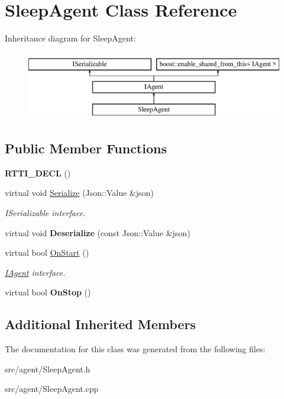 \hypertarget{class_sleep_agent}{}\section{Sleep\+Agent Class Reference}
\label{class_sleep_agent}
Inheritance diagram for Sleep\+Agent\+:\begin{figure}[H]
\begin{center}
\leavevmode
\includegraphics[height=3.000000cm]{class_sleep_agent}
\end{center}
\end{figure}
\subsection*{Public Member Functions}
\begin{DoxyCompactItemize}
\item 
\mbox{\label{class_sleep_agent_a82a480558c4c48a6462a6a4ea15435cf}} 
{\bfseries R\+T\+T\+I\+\_\+\+D\+E\+CL} ()
\item 
\mbox{\label{class_sleep_agent_ab9a117e823b74d2919592db41d88e36f}} 
virtual void \hyperlink{class_sleep_agent_ab9a117e823b74d2919592db41d88e36f}{Serialize} (Json\+::\+Value \&json)
\begin{DoxyCompactList}\small\item\em I\+Serializable interface. \end{DoxyCompactList}\item 
\mbox{\label{class_sleep_agent_a3b3757b6317970b9bd98416cb90dbfef}} 
virtual void {\bfseries Deserialize} (const Json\+::\+Value \&json)
\item 
\mbox{\label{class_sleep_agent_a2b4c948b619803fdb9f26c2fbcf501fd}} 
virtual bool \hyperlink{class_sleep_agent_a2b4c948b619803fdb9f26c2fbcf501fd}{On\+Start} ()
\begin{DoxyCompactList}\small\item\em \hyperlink{class_i_agent}{I\+Agent} interface. \end{DoxyCompactList}\item 
\mbox{\label{class_sleep_agent_a84d45d8dbd08e932ba8b4da8ccd8bbf4}} 
virtual bool {\bfseries On\+Stop} ()
\end{DoxyCompactItemize}
\subsection*{Additional Inherited Members}


The documentation for this class was generated from the following files\+:\begin{DoxyCompactItemize}
\item 
src/agent/Sleep\+Agent.\+h\item 
src/agent/Sleep\+Agent.\+cpp\end{DoxyCompactItemize}
